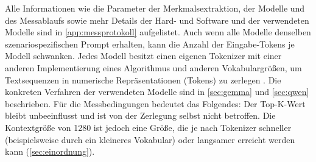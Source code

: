\noindent Alle Informationen wie die Parameter der Merkmalsextraktion, der Modelle und des Messablaufs sowie mehr Details der Hard- und Software und der verwendeten Modelle sind in \autoref{app:messprotokoll} aufgelistet.
Auch wenn alle Modelle denselben szenariospezifischen Prompt erhalten, kann die Anzahl der Eingabe-Tokens je Modell schwanken. Jedes Modell besitzt einen eigenen Tokenizer mit einer anderen Implementierung eines Algorithmus und anderen Vokabulargrößen, um Textsequenzen in numerische Repräsentationen (Tokens) zu zerlegen \autocite{petrov_tokenizer_2023}.
Die konkreten Verfahren der verwendeten Modelle sind in \autoref{sec:gemma} und \autoref{sec:qwen} beschrieben. Für die Messbedingungen bedeutet das Folgendes: Der Top-K-Wert bleibt unbeeinflusst und ist von der Zerlegung selbst nicht betroffen. Die Kontextgröße von 1280 ist jedoch eine Größe, die je nach Tokenizer schneller (beispielsweise durch ein kleineres Vokabular) oder langsamer erreicht werden kann (\autoref{sec:einordnung}).